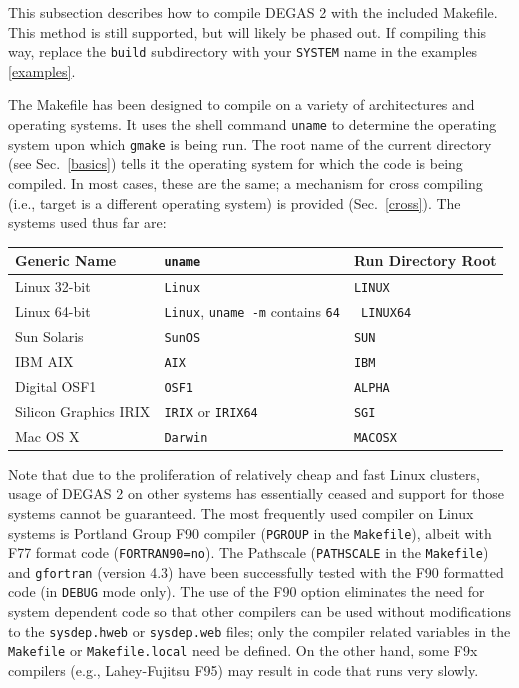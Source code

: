 \documentclass[12pt]{report}
\begin{document}
This subsection describes how to compile DEGAS 2 with the included Makefile.
This method is still supported, but will likely be phased out. 
If compiling this way, replace the {\tt build} subdirectory with your {\tt SYSTEM} name in the examples \ref{examples}.

The Makefile has been designed to compile on  a variety of architectures
and operating systems. It uses the shell command {\tt uname} to
determine the operating system upon which {\tt gmake} is being run.  The root
name of the current directory (see Sec.~\ref{basics}) tells it the
operating system for which the code is being compiled.  In most cases,
these are the same; a mechanism for cross compiling (i.e., target is a
different operating system) is provided (Sec.~\ref{cross}).
The systems used thus far are: 

\begin{center}
\begin{tabular}{lp{10 em}l}
Generic Name & {\tt uname} & Run Directory Root \\ \hline
Linux 32-bit & {\tt Linux} & {\tt LINUX} \\
Linux 64-bit & {\tt Linux}, {\tt uname -m} contains {\tt 64} & {\tt
  LINUX64} \\
Sun Solaris & {\tt SunOS} & {\tt SUN} \\
IBM AIX & {\tt AIX} & {\tt IBM} \\
Digital OSF1 & {\tt OSF1} & {\tt ALPHA} \\
Silicon Graphics IRIX & {\tt IRIX} or {\tt IRIX64} & {\tt SGI} \\
Mac OS X & {\tt Darwin} & {\tt MACOSX} \\
\end{tabular}
\end{center}

Note that due to the proliferation of relatively cheap and fast
Linux clusters, usage of DEGAS 2 on other systems has essentially
ceased and support for those systems cannot be guaranteed.
The most frequently used compiler on Linux systems
is Portland Group F90 compiler ({\tt PGROUP} in
the {\tt Makefile}), albeit with F77 format code 
({\tt FORTRAN90=no}).  The Pathscale ({\tt PATHSCALE} in 
the {\tt Makefile}) and {\tt gfortran} (version 4.3) have been
successfully tested with the F90 formatted code (in
{\tt DEBUG} mode only). The use of
the F90 option eliminates the need for system dependent code
so that other compilers can be used without modifications to
the {\tt sysdep.hweb} or {\tt sysdep.web} files; only the
compiler
related variables in the {\tt Makefile} or {\tt Makefile.local}
need be defined. On the other hand, some F9x compilers (e.g.,
Lahey-Fujitsu F95) may result in code that runs very slowly.
\end{document}
